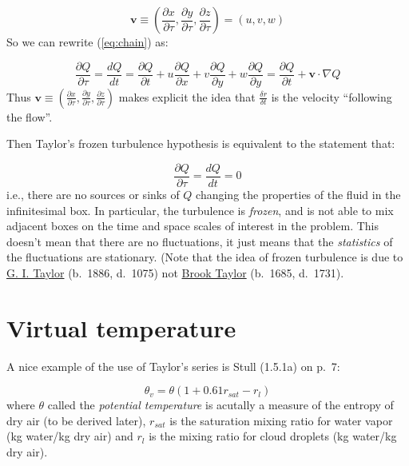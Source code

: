 \documentclass[12pt]{article}
\begin{document}
\begin{equation}
  \label{eq:velocity}
  \mathbf{v} \equiv 
\left ( \frac{\partial x}{\partial \tau} , \frac{\partial y}{\partial \tau}, 
   \frac{\partial z}{\partial \tau} \right ) =
\left ( u, v, w \right )
\end{equation}
So we can rewrite (\ref{eq:chain}) as:

\begin{equation}
  \label{eq:chain2}
  \frac{\partial Q}{\partial \tau} = \frac{d Q}{dt} = 
\frac{\partial Q}{\partial t} +
u \frac{\partial Q}{\partial x}  + 
v \frac{\partial Q}{\partial y} +
w \frac{\partial Q}{\partial y} =
\frac{\partial Q}{\partial t} +
\mathbf{v} \cdot \nabla Q
\end{equation}
Thus   $\mathbf{v} \equiv 
   \left ( \frac{\partial x}{\partial \tau} , \frac{\partial y}{\partial \tau}, 
   \frac{\partial z}{\partial \tau} \right )$
makes explicit the idea that $\frac{\delta r }{\delta t}$ is the velocity
``following the flow''.


Then Taylor's frozen turbulence hypothesis is equivalent to the statement that:

\begin{equation}
  \label{eq:taylor}
\frac{\partial Q}{\partial \tau} =  \frac{d Q}{dt} = 0
\end{equation}
i.e., there are no sources or sinks of $Q$ changing the properties of the
fluid in the infinitesimal box.    In particular, the turbulence is
\textit{frozen}, and is not able to mix adjacent boxes on the time and
space scales of interest in the problem.  This doesn't mean that
there are no fluctuations, it just means that the \textit{statistics} of 
the fluctuations are stationary.  (Note that
the idea of frozen turbulence is due to 
\href{http://en.wikipedia.org/wiki/Geoffrey_Ingram_Taylor}{G. I. Taylor} (b.~1886, d.~1075)
not \href{http://en.wikipedia.org/wiki/Brook_Taylor}{Brook Taylor} (b.~1685, d.~1731). 


\section{Virtual temperature}
\label{sec:virtual-temperature}

A nice example of the use of Taylor's series is Stull (1.5.1a) on p.~7:

\begin{equation*}
  \theta_v = \theta ( 1 + 0.61 r_{sat} - r_l )
\end{equation*}
where $\theta$ called the \textit{potential temperature} is acutally a measure
of the entropy of dry air (to be derived later), $r_{sat}$ is the saturation
mixing ratio for water vapor (kg water/kg dry air) and $r_l$ is the
mixing ratio for cloud droplets (kg water/kg dry air).
\end{document}
